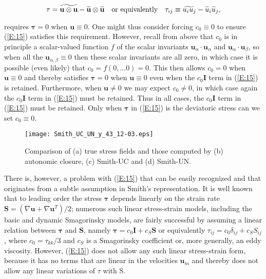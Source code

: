 %
\begin{equation}
	\label{E:16}
	\mathbf{\tau} = \widetilde{\mathbf{u} \otimes \mathbf{u}} 
		 - \widetilde{\mathbf{u}} \otimes \widetilde{\mathbf{u}}
	\quad \textnormal{or equivalently} \quad
	\tau_{ij} \equiv \widetilde{u_i u_j} - \widetilde{u}_i \widetilde{u}_j,  
\end{equation}
%
%        

requires $\mathbf{\tau} = 0$  when $\mathbf{u} \equiv 0$. One might thus consider forcing $c_0 \equiv 0$  to ensure (\ref{E:15}) satisfies this requirement.  However, recall from above that $c_0$  is in principle a scalar-valued function $f$  of the scalar invariants  $\mathbf{u}_{\alpha} \cdot \mathbf{u}_{\alpha}$ and $\mathbf{u}_{\alpha} \cdot \mathbf{u}_{\beta}$, so when all the  $\mathbf{u}_{\alpha, \beta} \equiv 0$ then these scalar invariants are all zero, in which case it is possible (even likely) that $c_0 = f(0,\ldots0) = 0$.  This then allows $c_0 = 0$   when  $\mathbf{u} \equiv 0$ and thereby satisfies $\mathbf{\tau} = 0$  when  $\mathbf{u} \equiv 0$ even when the $c_0 \mathbf{I}$  term in (\ref{E:15}) is retained.  Furthermore, when $\mathbf{u} \neq 0$  we may expect $c_0 \neq 0$, in which case again the $c_0 \mathbf{I}$ term in (\ref{E:15}) must be retained.  Thus in all cases, the  $c_0 \mathbf{I}$ term in (\ref{E:15}) must be retained.  Only when  $\mathbf{\tau}$ in (\ref{E:15}) is the deviatoric stress can we set $c_0 \equiv 0$.



%
\begin{figure}
	\begin{center}
	\texttt{[image: Smith\_UC\_UN\_y\_43\_12-03.eps]}
	\caption{Comparison of (a) true stress fields and those computed by (b) autonomic closure, (c) Smith-UC and (d) Smith-UN. }
	\label{F:Smith_UC}
	\end{center}
\end{figure}
%
%

There is, however, a problem with (\ref{E:15}) that can be easily recognized and that originates from a subtle assumption in Smith’s representation.  It is well known that to leading order the stress  $\mathbf{\tau}$ depends linearly on the strain rate $\mathbf{S} = (\nabla \mathbf{u} + \nabla \mathbf{u}^T)/2$; numerous such linear stress-strain models, including the basic and dynamic Smagorinsky models, are fairly successful by assuming a linear relation between $\mathbf{\tau}$  and $\mathbf{S}$, namely $\mathbf{\tau} = c_0\mathbf{I} + c_S \mathbf{S}$  or equivalently $\tau_{ij} = c_0\delta_{ij} + c_S S_{ij}$, where $c_0 = \tau_{kk}/3$  and $c_S$  is a Smagorinsky coefficient or, more generally, an eddy viscosity.  However, (\ref{E:15}) does not allow any such linear stress-strain form, because it has no terms that are linear in the velocities $\mathbf{u}_{m}$  and thereby does not allow any linear variations of $\tau$ with S.

